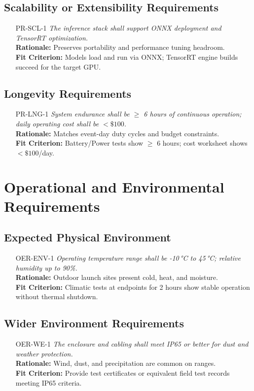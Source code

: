 \documentclass[12pt]{article}
\begin{document}
\subsection{Scalability or Extensibility Requirements}
\begin{itemize}[leftmargin=*]
  \item[PR-SCL-1] \emph{The inference stack shall support ONNX deployment and TensorRT optimization.}\\
  \textbf{Rationale:} Preserves portability and performance tuning headroom.\\
  \textbf{Fit Criterion:} Models load and run via ONNX; TensorRT engine builds succeed for the target GPU.
\end{itemize}
\subsection{Longevity Requirements}
\begin{itemize}[leftmargin=*]
  \item[PR-LNG-1] \emph{System endurance shall be $\geq$ 6 hours of continuous operation; daily operating cost shall be $<\$100$.}\\
  \textbf{Rationale:} Matches event-day duty cycles and budget constraints.\\
  \textbf{Fit Criterion:} Battery/Power tests show $\geq$ 6 hours; cost worksheet shows $<\$100$/day.
\end{itemize}

\section{Operational and Environmental Requirements}

\subsection{Expected Physical Environment}
\begin{itemize}[leftmargin=*]
  \item[OER-ENV-1] \emph{Operating temperature range shall be -10\,°C to 45\,°C; relative humidity up to 90\%.}\\
  \textbf{Rationale:} Outdoor launch sites present cold, heat, and moisture.\\
  \textbf{Fit Criterion:} Climatic tests at endpoints for 2 hours show stable operation without thermal shutdown.
\end{itemize}

\subsection{Wider Environment Requirements}
\begin{itemize}[leftmargin=*]
  \item[OER-WE-1] \emph{The enclosure and cabling shall meet IP65 or better for dust and weather protection.}\\
  \textbf{Rationale:} Wind, dust, and precipitation are common on ranges.\\
  \textbf{Fit Criterion:} Provide test certificates or equivalent field test records meeting IP65 criteria.
\end{itemize}
\end{document}
